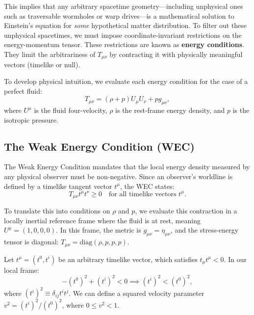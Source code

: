 \documentclass[11pt, a4paper]{report}
\begin{document}
This implies that any arbitrary spacetime geometry—including unphysical ones such as traversable wormholes or warp drives—is a mathematical solution to Einstein's equation for \textit{some} hypothetical matter distribution. To filter out these unphysical spacetimes, we must impose coordinate-invariant restrictions on the energy-momentum tensor. These restrictions are known as \textbf{energy conditions}. They limit the arbitrariness of $T_{\mu\nu}$ by contracting it with physically meaningful vectors (timelike or null).

To develop physical intuition, we evaluate each energy condition for the case of a perfect fluid:
\begin{equation}
\label{eq:perfect_fluid}
T_{\mu\nu} = (\rho + p)U_{\mu}U_{\nu} + p g_{\mu\nu},
\end{equation}
where $U^{\mu}$ is the fluid four-velocity, $\rho$ is the rest-frame energy density, and $p$ is the isotropic pressure.

\subsection{The Weak Energy Condition (WEC)}

The Weak Energy Condition mandates that the local energy density measured by any physical observer must be non-negative. Since an observer's worldline is defined by a timelike tangent vector $t^{\mu}$, the WEC states:
\begin{equation}
T_{\mu\nu} t^{\mu} t^{\nu} \ge 0 \quad \text{for all timelike vectors } t^{\mu}.
\end{equation}

To translate this into conditions on $\rho$ and $p$, we evaluate this contraction in a locally inertial reference frame where the fluid is at rest, meaning $U^{\mu} = (1, 0, 0, 0)$. In this frame, the metric is $g_{\mu\nu} = \eta_{\mu\nu}$, and the stress-energy tensor is diagonal: $T_{\mu\nu} = \text{diag}(\rho, p, p, p)$.

Let $t^{\mu} = (t^{0}, t^{i})$ be an arbitrary timelike vector, which satisfies $t_{\mu}t^{\mu} < 0$. In our local frame:
\begin{equation}
-(t^{0})^{2} + (t^{i})^{2} < 0 \implies (t^{i})^{2} < (t^{0})^{2},
\end{equation}
where $(t^{i})^{2} \equiv \delta_{ij} t^{i} t^{j}$. We can define a squared velocity parameter $v^{2} = (t^{i})^{2}/(t^{0})^{2}$, where $0 \le v^{2} < 1$. 
\end{document}
